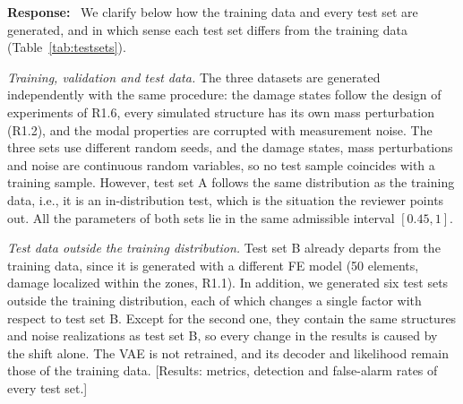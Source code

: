 \documentclass[11pt]{article}
\newenvironment{response}{\par\smallskip\noindent\color{resp}\textbf{Response:}\ }{\par}
\newcommand{\tbd}[1]{\textcolor{note}{\textsf{[#1]}}}
\begin{document}
\begin{response}
We clarify below how the training data and every test set are generated, and in which sense each test set differs from
the training data (Table~\ref{tab:testsets}).

\textit{Training, validation and test data.} The three datasets are generated independently with the same procedure: the
damage states follow the design of experiments of R1.6, every simulated structure has its own mass perturbation (R1.2), and
the modal properties are corrupted with measurement noise. The three sets use different random seeds, and the damage
states, mass perturbations and noise are continuous random variables, so no test sample coincides with a training
sample. However, test set A follows the same distribution as the training data, i.e., it is an in-distribution test,
which is the situation the reviewer points out. All the parameters of both sets lie in the same admissible interval
$[0.45,1]$.

\textit{Test data outside the training distribution.} Test set B already departs from the training data, since it is
generated with a different FE model (50 elements, damage localized within the zones, R1.1). In addition, we generated six
test sets outside the training distribution, each of which changes a single factor with respect to test set B. Except for
the second one, they contain the same structures and noise realizations as test set B, so every change in the results is
caused by the shift alone. The VAE is not retrained, and its decoder and likelihood remain those of the training data.
\tbd{Results: metrics, detection and false-alarm rates of every test set.}
\end{response}
\end{document}
